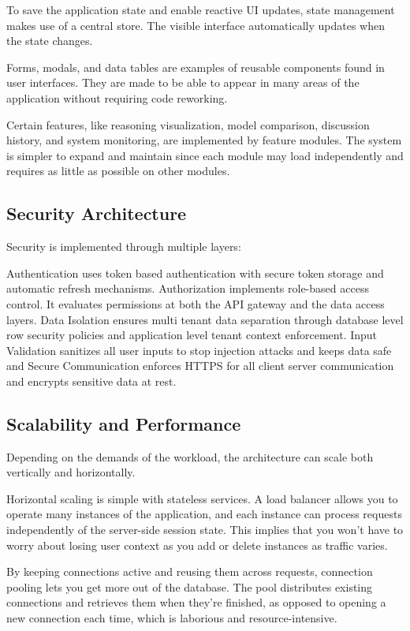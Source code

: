\documentclass[final,5p,times,twocolumn,authoryear,draft]{elsarticle}
\begin{document}
To save the application state and enable reactive UI updates, state management makes use of a central store. The visible interface automatically updates when the state changes.

Forms, modals, and data tables are examples of reusable components found in user interfaces. They are made to be able to appear in many areas of the application without requiring code reworking.

Certain features, like reasoning visualization, model comparison, discussion history, and system monitoring, are implemented by feature modules. The system is simpler to expand and maintain since each module may load independently and requires as little as possible on other modules.

\subsection{Security Architecture}

Security is implemented through multiple layers:

Authentication uses token based authentication with secure token storage and automatic refresh mechanisms. Authorization implements role-based access control. It evaluates permissions at both the API gateway and the data access layers. Data Isolation ensures multi tenant data separation through database level row security policies and application level tenant context enforcement. Input Validation sanitizes all user inputs to stop injection attacks and keeps data safe and Secure Communication enforces HTTPS for all client server communication and encrypts sensitive data at rest.

\subsection{Scalability and Performance}

Depending on the demands of the workload, the architecture can scale both vertically and horizontally.

Horizontal scaling is simple with stateless services. A load balancer allows you to operate many instances of the application, and each instance can process requests independently of the server-side session state. This implies that you won't have to worry about losing user context as you add or delete instances as traffic varies.

By keeping connections active and reusing them across requests, connection pooling lets you get more out of the database. The pool distributes existing connections and retrieves them when they're finished, as opposed to opening a new connection each time, which is laborious and resource-intensive.
\end{document}
